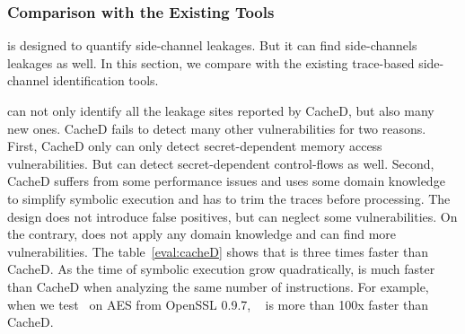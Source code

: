 \subsubsection{Comparison with the Existing Tools}
\tool{} is designed to quantify side-channel leakages. But it can
find side-channels leakages as well. In this section, we compare 
\tool{} with the existing trace-based side-channel identification 
tools.

\tool{} can not only identify all the leakage sites reported by CacheD,
but also many new ones.
CacheD fails to detect many other vulnerabilities for two
reasons. First, CacheD only can only detect secret-dependent
memory access vulnerabilities. But \tool{} can detect 
secret-dependent control-flows as well. Second, CacheD suffers
from some performance issues and uses some domain knowledge 
to simplify symbolic execution and has to trim the traces before processing. The design does 
not introduce false positives, but can neglect some vulnerabilities. 
On the contrary, \tool{} does not apply any domain knowledge and can find
more vulnerabilities. The table~\ref{eval:cacheD} shows that \tool{} is 
three times faster than CacheD. As the time of symbolic execution grow
quadratically, \tool{} is much faster than CacheD when analyzing the same
number of instructions. For example, when we test~\tool{} on 
AES from OpenSSL 0.9.7, ~\tool{} is more than 100x faster than CacheD.


